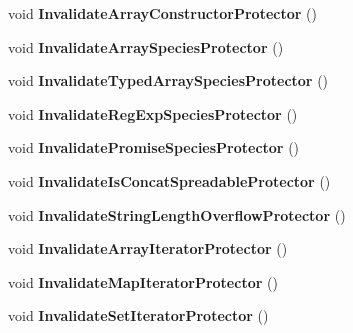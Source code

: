 \begin{DoxyCompactItemize}
void {\bfseries Invalidate\+Array\+Constructor\+Protector} ()
\item 
\mbox{\label{classv8_1_1internal_1_1Isolate_a67dfb1a3817728da50f85be1ff6224da}} 
void {\bfseries Invalidate\+Array\+Species\+Protector} ()
\item 
\mbox{\label{classv8_1_1internal_1_1Isolate_a8fc753c4ad1813a9aa28c2c8dbf0a1a0}} 
void {\bfseries Invalidate\+Typed\+Array\+Species\+Protector} ()
\item 
\mbox{\label{classv8_1_1internal_1_1Isolate_ab09a0cdd78e5176d6e05f009d146fd46}} 
void {\bfseries Invalidate\+Reg\+Exp\+Species\+Protector} ()
\item 
\mbox{\label{classv8_1_1internal_1_1Isolate_afc8e193bd63c67142f3dccfa73ad9ab9}} 
void {\bfseries Invalidate\+Promise\+Species\+Protector} ()
\item 
\mbox{\label{classv8_1_1internal_1_1Isolate_ac7fcaedf2f03a0b1f97750e124045d96}} 
void {\bfseries Invalidate\+Is\+Concat\+Spreadable\+Protector} ()
\item 
\mbox{\label{classv8_1_1internal_1_1Isolate_a7379d44aa836709395f65c2cb895b008}} 
void {\bfseries Invalidate\+String\+Length\+Overflow\+Protector} ()
\item 
\mbox{\label{classv8_1_1internal_1_1Isolate_a188cf5e8979645b9d91b2ae30485c113}} 
void {\bfseries Invalidate\+Array\+Iterator\+Protector} ()
\item 
\mbox{\label{classv8_1_1internal_1_1Isolate_a87e100c7302507424f02ce4201ec26d3}} 
void {\bfseries Invalidate\+Map\+Iterator\+Protector} ()
\item 
\mbox{\label{classv8_1_1internal_1_1Isolate_a5935a34212847d8056104039df1b3ea3}} 
void {\bfseries Invalidate\+Set\+Iterator\+Protector} ()
\item 
\mbox{\label{classv8_1_1internal_1_1Isolate_a0cef618c74d727ee4bb43faeb4bb4480}} 

\end{DoxyCompactItemize}
